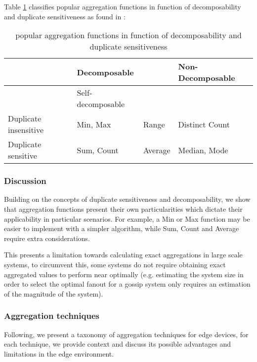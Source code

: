 Table \ref{table:aggregation_functions} classifies popular aggregation functions in function of decomposability and duplicate sensitiveness as found in \cite{DBLP:journals/corr/abs-1110-0725}:

\begin{table}[]
    \begin{tabular}{|l|l|l|l|}
    \hline
                          & \multicolumn{2}{l|}{Decomposable} & Non-Decomposable  \\ \hline
                          & Self-decomposable    &                             &  \\ \hline
    Duplicate insensitive & Min, Max             & Range     & Distinct Count    \\ \hline
    Duplicate sensitive   & Sum, Count           & Average   & Median, Mode     \\ \hline
    \end{tabular}
    \caption{popular aggregation functions in function of decomposability and duplicate sensitiveness}
    \label{table:aggregation_functions}
\end{table}

\subsubsection{Discussion}

Building on the concepts of duplicate sensitiveness and decomposability, we show that aggregation functions present their own particularities which dictate their applicability in particular scenarios. For example, a Min or Max function may be easier to implement with a simpler algorithm, while Sum, Count and Average require extra considerations. 

This presents a limitation towards calculating exact aggregations in large scale systems, to circumvent this, some systems do not require obtaining exact aggregated values to perform near optimally (e.g. estimating the system size in order to select the optimal fanout for a gossip system only requires an estimation of the magnitude of the system). 

\subsubsection{Aggregation techniques}

Following, we present a taxonomy of aggregation techniques for edge devices, for each technique, we provide context and discuss its possible advantages and limitations in the edge environment.

